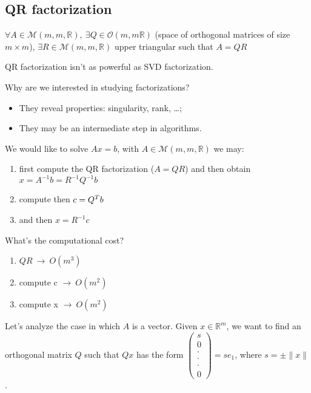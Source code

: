 \documentclass[computationalMathematics.tex]{subfiles}
\begin{document}
\subsection{QR factorization}

\begin{theorem}
  $\forall A \in \mathcal{M}(m, m, \mathds{R}),~ \exists  Q \in \mathcal{O}(m, m \mathds{R})$ (space of orthogonal matrices of size $m\times m$), $\exists R \in \mathcal{M}(m, m, \mathds{R})$ upper triangular such that $A=QR$
\end{theorem}

QR factorization isn't as powerful as SVD factorization.

Why are we interested in studying factorizations?

\begin{itemize}
  \item They reveal properties: singularity, rank, \dots;
  \item They may be an intermediate step in algorithms.
\end{itemize}

\begin{example}
  We would like to solve $Ax=b$, with $A \in \mathcal{M}(m, m, \mathds{R})$ we may:

\begin{enumerate}
  \item first compute the QR factorization ($A=QR$) and then obtain 
$x={A}^{-1}b={R}^{-1}{Q}^{-1}b$
  \item compute then $c= {Q}^{T}b$
  \item and then $x={R}^{-1}c$
\end{enumerate}
\end{example}


What's the computational cost?
\begin{enumerate}
  \item $QR ~ \rightarrow ~ O({m}^{3})$
  \item compute c $\rightarrow ~ O({m}^{2})$
  \item compute x $ \rightarrow ~ O({m}^{2})$
\end{enumerate}

Let's analyze the case in which $A$ is a vector. Given $x \in \mathds{R}^m$, we want to find an orthogonal matrix $Q$ such that $Qx$ has the form $\begin{pmatrix}s\\0\\ \cdot\\ \cdot\\ \cdot\\ 0\end{pmatrix} = se_{1}$, where $s= \pm \|x\|$.
  
\end{document}
